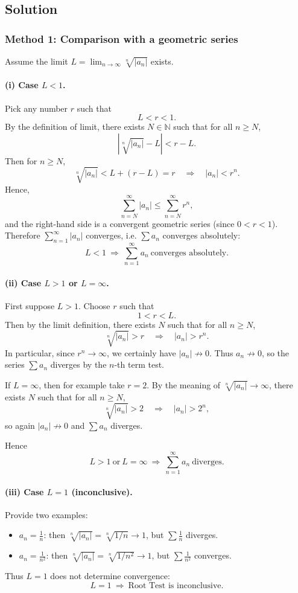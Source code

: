 \documentclass[12pt]{article}
\newcommand{\N}{\mathbb{N}}
\begin{document}
\subsection*{Solution}

\subsubsection*{Method 1: Comparison with a geometric series}
Assume the limit \(L=\lim_{n\to\infty}\sqrt[n]{|a_n|}\) exists.

\paragraph{(i) Case \(L<1\).}
Pick any number \(r\) such that
\[
L<r<1.
\]
By the definition of limit, there exists \(N\in\N\) such that for all \(n\ge N\),
\[
\left|\sqrt[n]{|a_n|}-L\right|<r-L.
\]
Then for \(n\ge N\),
\[
\sqrt[n]{|a_n|}<L+(r-L)=r
\quad\Longrightarrow\quad
|a_n|<r^n.
\]
Hence,
\[
\sum_{n=N}^{\infty}|a_n|\le \sum_{n=N}^{\infty} r^n,
\]
and the right-hand side is a convergent geometric series (since \(0<r<1\)).
Therefore \(\sum_{n=1}^\infty |a_n|\) converges, i.e. \(\sum a_n\) converges absolutely:
\[
\boxed{L<1\ \Longrightarrow\ \sum_{n=1}^\infty a_n\ \text{converges absolutely}.}
\]

\paragraph{(ii) Case \(L>1\) or \(L=\infty\).}
First suppose \(L>1\). Choose \(r\) such that
\[
1<r<L.
\]
Then by the limit definition, there exists \(N\) such that for all \(n\ge N\),
\[
\sqrt[n]{|a_n|}>r
\quad\Longrightarrow\quad
|a_n|>r^n.
\]
In particular, since \(r^n\to\infty\), we certainly have \(|a_n|\not\to 0\). Thus \(a_n\not\to 0\), so the series \(\sum a_n\) diverges by the \(n\)-th term test.

If \(L=\infty\), then for example take \(r=2\). By the meaning of \(\sqrt[n]{|a_n|}\to\infty\), there exists \(N\) such that for all \(n\ge N\),
\[
\sqrt[n]{|a_n|}>2 \quad\Longrightarrow\quad |a_n|>2^n,
\]
so again \(|a_n|\not\to 0\) and \(\sum a_n\) diverges.

Hence
\[
\boxed{L>1\ \text{or}\ L=\infty\ \Longrightarrow\ \sum_{n=1}^\infty a_n\ \text{diverges}.}
\]

\paragraph{(iii) Case \(L=1\) (inconclusive).}
Provide two examples:
\begin{itemize}[leftmargin=*]
  \item \(a_n=\frac{1}{n}\): then \(\sqrt[n]{|a_n|}=\sqrt[n]{1/n}\to 1\), but \(\sum \frac{1}{n}\) diverges.
  \item \(a_n=\frac{1}{n^2}\): then \(\sqrt[n]{|a_n|}=\sqrt[n]{1/n^2}\to 1\), but \(\sum \frac{1}{n^2}\) converges.
\end{itemize}
Thus \(L=1\) does not determine convergence:
\[
\boxed{L=1\ \Longrightarrow\ \text{Root Test is inconclusive}.}
\]
\end{document}
